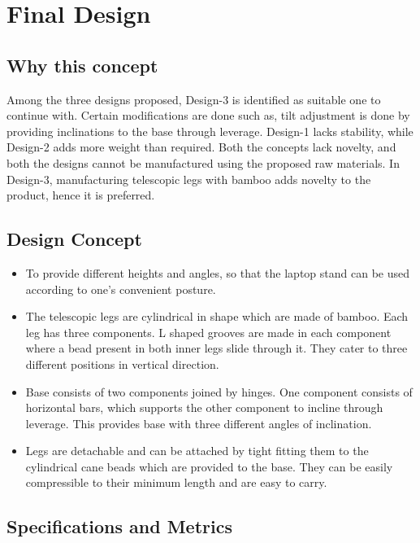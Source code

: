 \chapter{Final Design}

\section{Why this concept}

Among the three designs proposed, Design-3 is identified as suitable one to continue with. Certain modifications are done such as, tilt adjustment is done by providing inclinations to the base through leverage.  Design-1 lacks stability, while Design-2 adds more weight than required. Both the concepts lack novelty, and both the designs cannot be manufactured using the proposed raw materials. In Design-3, manufacturing telescopic legs with bamboo adds novelty to the product, hence it is preferred. 

\section{Design Concept}

\begin{itemize}
\item To provide different heights and angles, so that the laptop stand can be used according to one’s convenient posture. 

\item The telescopic legs are cylindrical in shape which are made of bamboo. Each leg has three components. L shaped grooves are made in each component where a bead present in both inner legs slide through it. They cater to three different positions in vertical direction.

\item Base consists of two components joined by hinges. One component consists of horizontal bars, which supports the other component to incline through leverage. This provides base with three different angles of inclination.

\item Legs are detachable and can be attached by tight fitting them to the cylindrical cane beads which are provided to the base. They can be easily compressible to their minimum length and are easy to carry.

\end{itemize}

\section{Specifications and Metrics}

